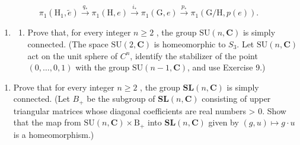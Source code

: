 \[
\pi_ {1} (\mathrm{H} _ {1}, \widetilde {e}) \xrightarrow {q _ {*}} \pi_ {1} (\mathrm{H}, e) \xrightarrow {i _ {*}} \pi_ {1} (\mathrm{G}, e) \xrightarrow {p _ {*}} \pi_ {1} (\mathrm{G} / \mathrm{H}, p (e)).
\]

\begin{enumerate}
\def\labelenumi{\arabic{enumi})}
\setcounter{enumi}{9}
\tightlist
\item
  \begin{enumerate}
  \def\labelenumii{\alph{enumii})}
  \tightlist
  \item
    Prove that, for every integer \(n \geqslant 2\) , the group \(\mathrm{SU}(n, \mathbf{C})\) is simply connected. (The space \(\mathrm{SU}(2, \mathbf{C})\) is homeomorphic to \(S_{3}\). Let \(\mathrm{SU}(n, \mathbf{C})\) act on the unit sphere of \(C^{n}\), identify the stabilizer of the point \((0, \ldots, 0, 1)\) with the group \(\mathrm{SU}(n - 1, \mathbf{C})\), and use Exercise 9.)
  \end{enumerate}
\end{enumerate}

\begin{enumerate}
\def\labelenumi{\alph{enumi})}
\setcounter{enumi}{1}
\tightlist
\item
  Prove that for every integer \(n \geqslant 2\) , the group \(\mathbf{SL}(n, \mathbf{C})\) is simply connected. (Let \(B_{+}\) be the subgroup of \(\mathbf{SL}(n, \mathbf{C})\) consisting of upper triangular matrices whose diagonal coefficients are real numbers \textgreater{} 0. Show that the map from \(\mathrm{SU}(n, \mathbf{C}) \times \mathrm{B}_{+}\) into \(\mathbf{SL}(n, \mathbf{C})\) given by \((g, u) \mapsto g \cdot u\) is a homeomorphism.)
\end{enumerate}

